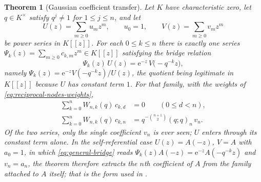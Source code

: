 \documentclass[11pt,oneside,openany]{book}
\newtheorem{theorem}{Theorem}[chapter]
\theoremstyle{definition}
\theoremstyle{remark}
\newcommand{\e}{\mathrm e}
\begin{document}
\begin{theorem}[Gaussian coefficient transfer]\label{thm:gaussian-coefficient-transfer}
Let $K$ have characteristic zero, let $q\in K^{\times}$ satisfy $q^j\ne1$ for $1\le j\le n$, and let
\[
 U(z)=\sum_{m\ge0}u_mz^m,\qquad u_0=1,
 \qquad
 V(z)=\sum_{m\ge0}v_mz^m
\]
be power series in $K[[z]]$.  For each $0\le k\le n$ there is exactly one series $\Psi_k(z)=\sum_{m\ge0}c_{k,m}z^m\in K[[z]]$ satisfying the bridge relation
\begin{equation}\label{eq:general-bridge}
 \Psi_k(z)\,U(z)=\e^{-z}\,V\bigl(-q^{-k}z\bigr),
\end{equation}
namely $\Psi_k(z)=\e^{-z}V(-q^{-k}z)/U(z)$, the quotient being legitimate in $K[[z]]$ because $U$ has constant term $1$.  For that family, with the weights of \eqref{eq:reciprocal-nodes-weights},
\begin{align}
 \sum_{k=0}^{n}W_{n,k}(q)\,c_{k,d}&=0
 \qquad(0\le d<n),\label{eq:transfer-lower-zero}\\
 \sum_{k=0}^{n}W_{n,k}(q)\,c_{k,n}
 &=q^{-\binom{n+1}{2}}(q;q)_n\,v_n.\label{eq:transfer-top}
\end{align}
Of the two series, only the single coefficient $v_n$ is ever seen; $U$ enters through its constant term alone.  In the self-referential case $U(z)=A(-z)$, $V=A$ with $a_0=1$, in which \eqref{eq:general-bridge} reads $\Psi_k(z)A(-z)=\e^{-z}A(-q^{-k}z)$ and $v_n=a_n$, the theorem therefore extracts the $n$th coefficient of $A$ from the family attached to $A$ itself; that is the form used in .
\end{theorem}
\end{document}
